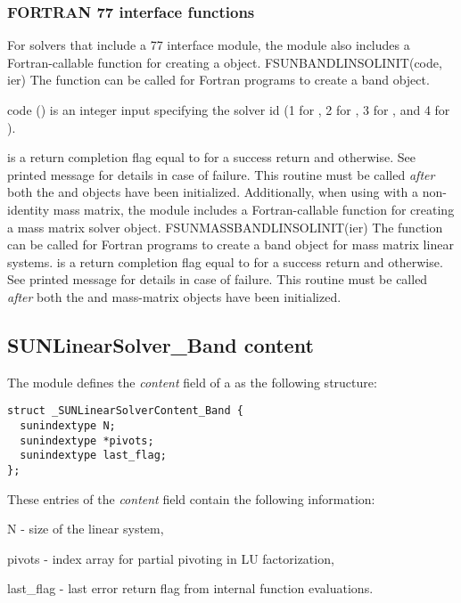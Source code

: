\subsubsection*{FORTRAN 77 interface functions}
For solvers that include a {\F} 77 interface module, the {\sunlinsolband}
module also includes a Fortran-callable function for creating a
 object.
%
%
{
  FSUNBANDLINSOLINIT(code, ier)
}
{
  The function  can be called for Fortran programs
  to create a band  object.
}
{
  \begin{args}[code]
  \item[code] ()
    is an integer input specifying the solver id (1 for {\cvode}, 2
    for {\ida}, 3 for {\kinsol}, and 4 for {\arkode}).
  \end{args}
}
{
   is a return completion flag equal to  for a success
  return and  otherwise. See printed message for details in case
  of failure.
}
{
  This routine must be
  called \emph{after} both the {\nvector} and {\sunmatrix} objects have
  been initialized.
}
Additionally, when using {\arkode} with a non-identity
mass matrix, the {\sunlinsolband} module includes a Fortran-callable
function for creating a  mass matrix solver
object.
%
%
{
  FSUNMASSBANDLINSOLINIT(ier)
}
{
  The function  can be called for Fortran programs
  to create a band  object for mass matrix linear
  systems.
}
{}
{
   is a  return completion flag equal to  for a success
  return and  otherwise. See printed message for details in case
  of failure.
}
{
  This routine must be
  called \emph{after} both the {\nvector} and {\sunmatrix} mass-matrix
  objects have been initialized.
}


\subsection{SUNLinearSolver\_Band content}
\label{ss:sunlinsol_band_content}

The {\sunlinsolband} module defines the \textit{content} field of a
 as the following structure:
\begin{verbatim}
struct _SUNLinearSolverContent_Band {
  sunindextype N;
  sunindextype *pivots;
  sunindextype last_flag;
};
\end{verbatim}
These entries of the \emph{content} field contain the following
information:
\begin{args}
  \item[N] - size of the linear system,
  \item[pivots] - index array for partial pivoting in LU factorization,
  \item[last\_flag] - last error return flag from internal function evaluations.
\end{args}
